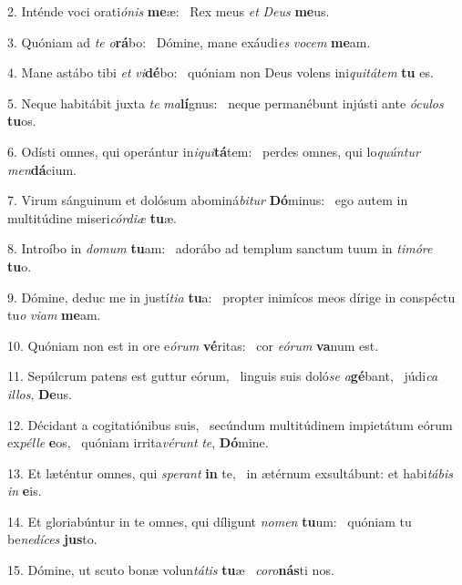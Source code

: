 2. Inténde voci orati\textit{ó}\textit{nis} \textbf{me}æ: \ast\  Rex meus \textit{et} \textit{De}\textit{us} \textbf{me}us.\

3. Quóniam ad \textit{te} \textit{o}\textbf{rá}bo: \ast\  Dómine, mane exáudi\textit{es} \textit{vo}\textit{cem} \textbf{me}am.\

4. Mane astábo tibi \textit{et} \textit{vi}\textbf{dé}bo: \ast\  quóniam non Deus volens ini\textit{qui}\textit{tá}\textit{tem} \textbf{tu} es.\

5. Neque habitábit juxta \textit{te} \textit{ma}\textbf{lí}gnus: \ast\  neque permanébunt injústi ante \textit{ó}\textit{cu}\textit{los} \textbf{tu}os.\

6. Odísti omnes, qui operántur in\textit{i}\textit{qui}\textbf{tá}tem: \ast\  perdes omnes, qui lo\textit{quún}\textit{tur} \textit{men}\textbf{dá}cium.\

7. Virum sánguinum et dolósum abominá\textit{bi}\textit{tur} \textbf{Dó}minus: \ast\  ego autem in multitúdine miseri\textit{cór}\textit{di}\textit{æ} \textbf{tu}æ.\

8. Introíbo in \textit{do}\textit{mum} \textbf{tu}am: \ast\  adorábo ad templum sanctum tuum in \textit{ti}\textit{mó}\textit{re} \textbf{tu}o.\

9. Dómine, deduc me in justí\textit{ti}\textit{a} \textbf{tu}a: \ast\  propter inimícos meos dírige in conspéctu tu\textit{o} \textit{vi}\textit{am} \textbf{me}am.\

10. Quóniam non est in ore e\textit{ó}\textit{rum} \textbf{vé}ritas: \ast\  cor \textit{e}\textit{ó}\textit{rum} \textbf{va}num est.\

11. Sepúlcrum patens est guttur eórum, \dag\  linguis suis doló\textit{se} \textit{a}\textbf{gé}bant, \ast\  júdi\textit{ca} \textit{il}\textit{los}, \textbf{De}us.\

12. Décidant a cogitatiónibus suis, \dag\  secúndum multitúdinem impietátum eórum ex\textit{pél}\textit{le} \textbf{e}os, \ast\  quóniam irrita\textit{vé}\textit{runt} \textit{te}, \textbf{Dó}mine.\

13. Et læténtur omnes, qui \textit{spe}\textit{rant} \textbf{in} te, \ast\  in ætérnum exsultábunt: et habi\textit{tá}\textit{bis} \textit{in} \textbf{e}is.\

14. Et gloriabúntur in te omnes, qui díligunt \textit{no}\textit{men} \textbf{tu}um: \ast\  quóniam tu be\textit{ne}\textit{dí}\textit{ces} \textbf{jus}to.\

15. Dómine, ut scuto bonæ volun\textit{tá}\textit{tis} \textbf{tu}æ \ast\  \textit{co}\textit{ro}\textbf{nás}ti nos.\

